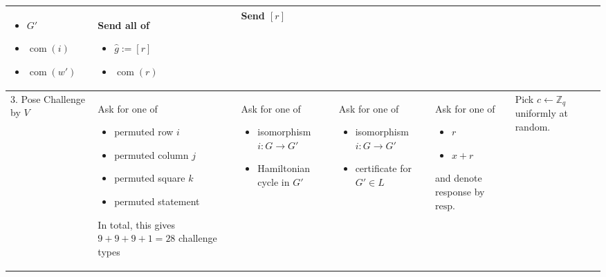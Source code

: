 \documentclass[border=1cm,varwidth=38cm]{standalone}
\DeclareMathOperator\com{com}
\newcommand\graph{G}
\newcommand\graphP{G'}
\newcommand\graphCertP{w'}
\newcommand\response{\text{resp.}}
\begin{document}
\begin{threeparttable}
\begin{tabularx}{36.5cm}{m{4cm}|m{6cm}|m{6cm}|m{6cm}|m{6cm}|m{6cm}}
\begin{itemize}
		\item $\graphP$
		\item $\com(i)$
		\item $\com(\graphCertP)$
	\end{itemize}
	&Send all of
	\begin{itemize}
			\item $\hat{g} := [r]$
			\item $\com(r)$
	\end{itemize}
	&Send $[r]$\\\hline
	3. Pose Challenge by $V$
	&Ask for one of
	\begin{itemize}
		\item permuted row $i$
		\item permuted column $j$
		\item permuted square $k$
		\item permuted statement
	\end{itemize}
	In total, this gives $9+9+9+1 = 28$ challenge types
	&Ask for one of\begin{itemize}
		\item isomorphism $i\colon\graph \to \graphP$
		\item Hamiltonian cycle in $\graphP$
	\end{itemize}
	& Ask for one of\begin{itemize}
		\item isomorphism $i\colon\graph \to \graphP$
		\item certificate for $\graphP \in L$
	\end{itemize}
	& Ask for one of\begin{itemize}
		\item $r$
		\item $x + r$
	\end{itemize} and denote response by $\response$
	& Pick $c \leftarrow \mathbb{Z}_q$ uniformly at random.


\end{tabularx}
\end{threeparttable}
\end{document}
